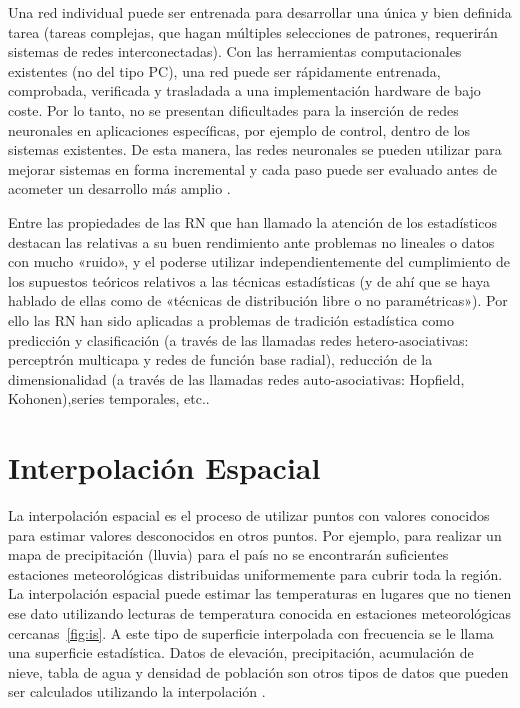 \begin{itemize}
{ Una red individual puede ser entrenada para desarrollar una única y bien
definida tarea (tareas complejas, que hagan múltiples selecciones de patrones,
requerirán sistemas de redes interconectadas). Con las herramientas computacionales
existentes (no del tipo PC), una red puede ser rápidamente entrenada,
comprobada, verificada y trasladada a una implementación hardware de bajo
coste. Por lo tanto, no se presentan dificultades para la inserción de redes
neuronales en aplicaciones específicas, por ejemplo de control, dentro de los
sistemas existentes. De esta manera, las redes neuronales se pueden utilizar para
mejorar sistemas en forma incremental y cada paso puede ser evaluado antes de
acometer un desarrollo más amplio \cite{pitarque2000redes}.
 }
\end{itemize}

Entre las propiedades de las RN que han llamado la atención de los estadísticos destacan las relativas a su buen rendimiento ante
problemas no lineales o datos con mucho «ruido», y el poderse utilizar independientemente del cumplimiento de los supuestos teóricos 
relativos a las técnicas estadísticas (y de ahí que se haya hablado de ellas como de «técnicas de distribución libre o no paramétricas»). 
Por ello las RN han sido aplicadas a problemas de tradición estadística como predicción y clasificación (a través de las
llamadas redes hetero-asociativas: perceptrón multicapa y redes de función base radial), reducción de la dimensionalidad (a través
de las llamadas redes auto-asociativas: Hopfield, Kohonen),series temporales, etc.\cite{pitarque1998redes}\cite{maneta2003aplicacion}\cite{rn2001giaiq}.

\section{Interpolación Espacial}

La interpolación espacial es el proceso de utilizar puntos con valores conocidos para estimar valores desconocidos en otros puntos. 
Por ejemplo, para realizar un mapa de precipitación (lluvia) para el país no se encontrarán suficientes estaciones meteorológicas distribuidas
uniformemente para cubrir toda la región. La interpolación espacial puede estimar las temperaturas en lugares que no tienen ese dato utilizando 
lecturas de temperatura conocida en estaciones meteorológicas cercanas~\ref{fig:is}. A este tipo de superficie interpolada con 
frecuencia se le llama una superficie estadística. Datos de elevación, precipitación, acumulación de nieve, tabla de agua y densidad de población 
son otros tipos de datos que pueden ser calculados utilizando la interpolación \cite{qgis2015online}.

